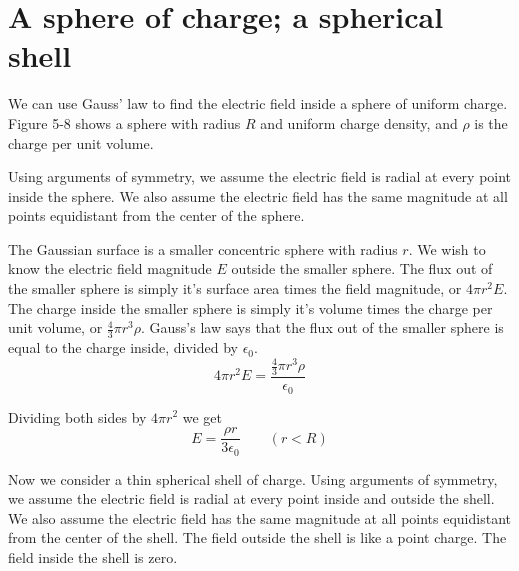 \section{A sphere of charge; a spherical shell}

We can use Gauss' law to find the electric field inside a sphere of uniform charge.
Figure 5-8 shows a sphere with radius $R$ and uniform charge density,
and $\rho$ is the charge per unit volume.

Using arguments of symmetry,
we assume the electric field is radial at every point inside the sphere.
We also assume the electric field has the same magnitude at all points
equidistant from the center of the sphere.

The Gaussian surface is a smaller concentric sphere with radius $r$.
We wish to know the electric field magnitude $E$ outside the smaller sphere.
The flux out of the smaller sphere is simply it's surface area
times the field magnitude, or $4\pi r^2 E$.
The charge inside the smaller sphere is simply it's volume times
the charge per unit volume, or $\frac{4}{3} \pi r^3 \rho$.
Gauss's law says that the flux out of the smaller sphere is equal to
the charge inside, divided by $\epsilon_0$.
\begin{equation*}
  4\pi r^2 E  = \frac{\frac{4}{3} \pi r^3 \rho}{\epsilon_0}
\end{equation*}

Dividing both sides by $4 \pi r^2$ we get
\begin{equation}
  E = \frac{\rho r}{3 \epsilon_0} \qquad (r < R)
\end{equation}

Now we consider a thin spherical shell of charge.
Using arguments of symmetry,
we assume the electric field is radial at every point inside and outside the shell.
We also assume the electric field has the same magnitude at all points 
equidistant from the center of the shell.
The field outside the shell is like a point charge.
The field inside the shell is zero.

